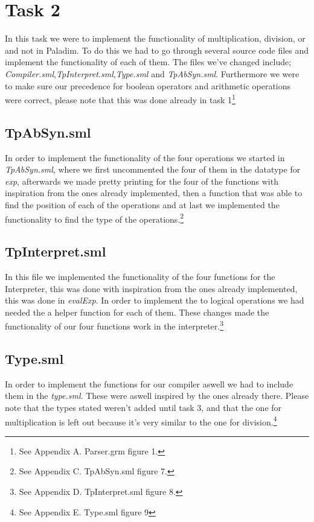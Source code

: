 \documentclass[12pt,a4paper,english]{article}
\begin{document}
\section{Task 2}
In this task we were to implement the functionality of multiplication, division, or and not in Paladim. To do this we had to go through several source code files and implement the functionality of each of them. The files we've changed include; \textit{Compiler.sml},\textit{TpInterpret.sml},\textit{Type.sml} and \textit{TpAbSyn.sml}. Furthermore we were to make sure our precedence for boolean operators and arithmetic operations were correct, please note that this was done already in task 1\footnote{See Appendix A. Parser.grm figure 1.}
\subsection{TpAbSyn.sml}
In order to implement the functionality of the four operations we started in \textit{TpAbSyn.sml}, where we first uncommented the four of them in the datatype for \textit{exp}, afterwards we made pretty printing for the four of the functions with inspiration from the ones already implemented, then a function that was able to find the position of each of the operations and at last we implemented the functionality to find the type of the operations.\footnote{See Appendix C. TpAbSyn.sml figure 7.}
\subsection{TpInterpret.sml}
In this file we implemented the functionality of the four functions for the Interpreter, this was done with inspiration from the ones already implemented, this was done in \textit{evalExp}. In order to implement the to logical operations we had needed the a helper function for each of them. These changes made the functionality of our four functions work in the interpreter.\footnote{See Appendix D. TpInterpret.sml figure 8.}
\subsection{Type.sml}
In order to implement the functions for our compiler aswell we had to include them in the \textit{type.sml}. These were aswell inspired by the ones already there. Please note that the types stated weren't added until task 3, and that the one for multiplication is left out because it's very similar to the one for division.\footnote{See Appendix E. Type.sml figure 9}
\end{document}
